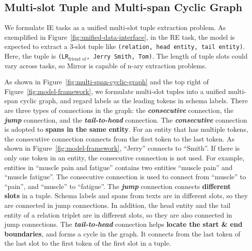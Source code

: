 \subsection{Multi-slot Tuple and Multi-span Cyclic Graph}

We formulate IE tasks as a unified multi-slot tuple extraction problem.
As exemplified in Figure~\ref{fig:unified-data-interface}, in the RE task, the model is expected to extract a 3-slot tuple like \texttt{(relation, head entity, tail entity)}.
Here, the tuple is \texttt{(LR$_{\text{friend of}}$, Jerry Smith, Tom)}.
The length of tuple slots could vary across tasks, so Mirror is capable of n-ary extraction problems.

As shown in Figure~\ref{fig:multi-span-cyclic-graph} and the top right of Figure~\ref{fig:model-framework}, we formulate multi-slot tuples into a unified multi-span cyclic graph, and regard labels as the leading tokens in schema labels.
There are three types of connections in the graph: the \textbf{\textit{consecutive}} connection, the \textbf{\color[HTML]{695efb} \textit{jump}} connection, and the \textbf{\color[HTML]{E9087F}\textit{tail-to-head}} connection.
The \textbf{\textit{consecutive}} connection is adopted to \textbf{spans in the same entity}.
For an entity that has multiple tokens, the consecutive connection connects from the first token to the last token.
As shown in Figure~\ref{fig:model-framework}, ``Jerry'' connects to ``Smith''.
If there is only one token in an entity, the consecutive connection is not used.
For example, entities in ``muscle pain and fatigue'' contains two entities ``muscle pain'' and ``muscle fatigue''.
The consecutive connection is used to connect from ``muscle'' to ``pain'', and ``muscle'' to ``fatigue''.
The \textbf{\color[HTML]{695efb} \textit{jump}} connection connects \textbf{different slots} in a tuple.
Schema labels and spans from texts are in different slots, so they are connected in jump connections.
In addition, the head entity and the tail entity of a relation triplet are in different slots, so they are also connected in jump connections.
The \textbf{\color[HTML]{E9087F}\textit{tail-to-head}} connection helps \textbf{locate the start \& end boundaries}, and forms a cycle in the graph.
It connects from the last token of the last slot to the first token of the first slot in a tuple.

